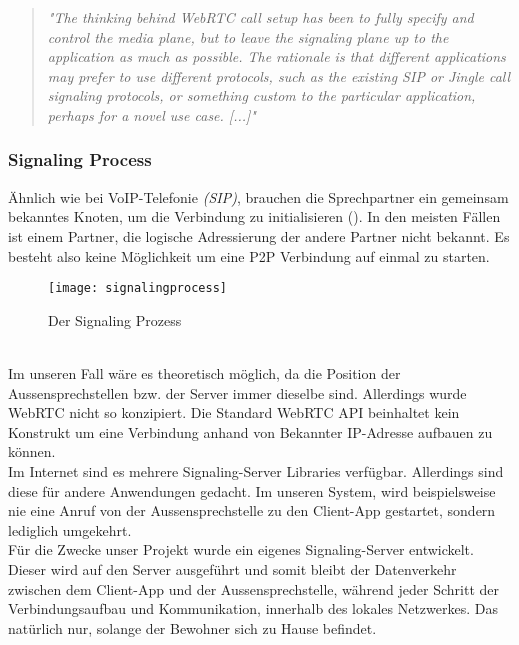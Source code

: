 \begin{quote}
	\textit{
		"The thinking behind WebRTC call setup has been to fully specify and control the media plane, but to leave the signaling plane up to the application as much as possible. The rationale is that different applications may prefer to use different protocols, such as the existing SIP or Jingle call signaling protocols, or something custom to the particular application, perhaps for a novel use case. [...]"
	} 
	\\
	\cite[Sam Dutton, HTML5Rocks.com]{001} 
\end{quote}

\subsubsection{Signaling Process}
\label{kap:signaling}

Ähnlich wie bei VoIP-Telefonie \textit{(SIP)}, brauchen die Sprechpartner ein gemeinsam bekanntes Knoten, um die Verbindung zu initialisieren (). In den meisten Fällen ist einem Partner, die logische Adressierung der andere Partner nicht bekannt. Es besteht also keine Möglichkeit um eine P2P Verbindung auf einmal zu starten.
\begin{figure}[htb!]
	\begin{center}
		\texttt{[image: signalingprocess]}
		\caption[Der Signaling Prozess]{Der Signaling Prozess}
		\label{fig:signaling}
	\end{center}
\end{figure}
\\
Im unseren Fall wäre es theoretisch möglich, da die Position der Aussensprechstellen bzw. der Server immer dieselbe sind. Allerdings wurde WebRTC nicht so konzipiert. Die Standard WebRTC API beinhaltet kein Konstrukt um eine Verbindung anhand von Bekannter IP-Adresse aufbauen zu können.
\\
Im Internet sind es mehrere Signaling-Server Libraries verfügbar. Allerdings sind diese für andere Anwendungen gedacht. Im unseren System, wird beispielsweise nie eine Anruf von der Aussensprechstelle zu den Client-App gestartet, sondern lediglich umgekehrt.
\\
Für die Zwecke unser Projekt wurde ein eigenes Signaling-Server entwickelt. Dieser wird auf den Server ausgeführt und somit bleibt der Datenverkehr zwischen dem Client-App und der Aussensprechstelle, während jeder Schritt der Verbindungsaufbau und Kommunikation, innerhalb des lokales Netzwerkes. Das natürlich nur, solange der Bewohner sich zu Hause befindet.

